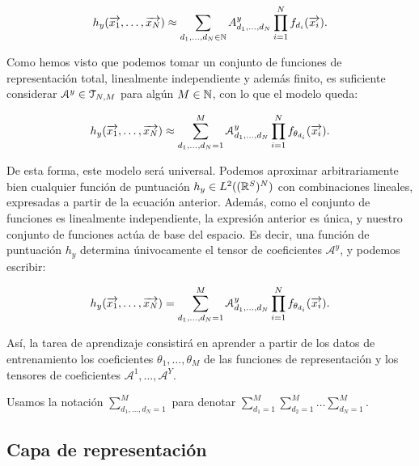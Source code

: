 \begin{equation} \label{eq:hipotesis_en_general}
	h_y(\overrightarrow{x_1}, \ldots, \overrightarrow{x_N}) \approx \sum_{d_1, \ldots, d_N \in \mathbb{N}} A^y_{d_1, \ldots, d_N} \prod_{i = 1}^N f_{d_i}(\overrightarrow{x_i}).
\end{equation}

Como hemos visto que podemos tomar un conjunto de funciones de representación total, linealmente independiente y además finito, es suficiente considerar $\mathcal{A}^y \in \mathcal{T}_{N, M}$ para algún $M \in \mathbb{N}$, con lo que el modelo queda:

\begin{equation}
	h_y(\overrightarrow{x_1}, \ldots, \overrightarrow{x_N}) \approx \sum_{d_1, \ldots, d_N = 1}^{M} \mathcal{A}^y_{d_1, \ldots, d_N} \prod_{i = 1}^N f_{\theta_{d_i}}(\overrightarrow{x_i}).
\end{equation}

De esta forma, este modelo será universal. Podemos aproximar arbitrariamente bien cualquier función de puntuación $h_y \in L^2((\mathbb{R}^S)^N)$ con combinaciones lineales, expresadas a partir de la ecuación anterior. Además, como el conjunto de funciones es linealmente independiente, la expresión anterior es única, y nuestro conjunto de funciones actúa de base del espacio. Es decir, una función de puntuación $h_y$ determina únivocamente el tensor de coeficientes $\mathcal{A}^y$, y podemos escribir:

\begin{equation} \label{eq:puntuacion_general}
	h_y(\overrightarrow{x_1}, \ldots, \overrightarrow{x_N}) = \sum_{d_1, \ldots, d_N = 1}^{M} \mathcal{A}^y_{d_1, \ldots, d_N} \prod_{i = 1}^N f_{\theta_{d_i}}(\overrightarrow{x_i}).
\end{equation}

Así, la tarea de aprendizaje consistirá en aprender a partir de los datos de entrenamiento los coeficientes $\theta_1, \ldots, \theta_M$ de las funciones de representación y los tensores de coeficientes $\mathcal{A}^1, \ldots, \mathcal{A}^Y$.

\begin{observacion}
	Usamos la notación $\sum_{d_1, \ldots, d_N = 1}^{M}$ para denotar $\sum_{d_1 = 1}^{M} \sum_{d_2 = 1}^{M} \ldots \sum_{d_N = 1}^{M}$.
\end{observacion}

\subsection{Capa de representación} \label{subs:capa_de_representacion}

